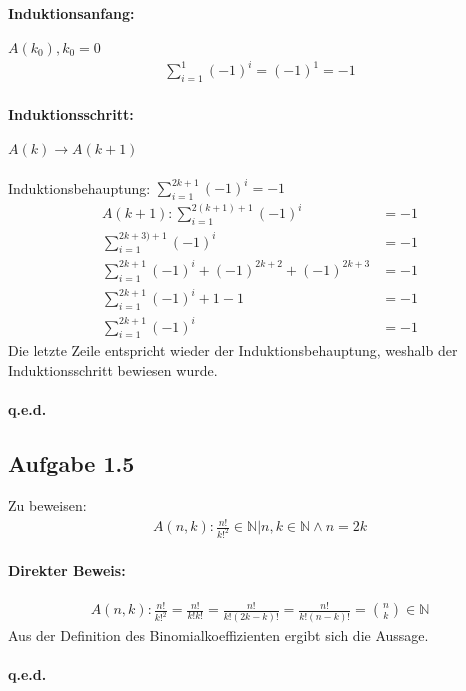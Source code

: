 \documentclass{article}
\begin{document}
    \paragraph*{Induktionsanfang:} $A(k_0), k_0=0$
    \begin{align*}
        \sum^{1}_{i=1}(-1)^i= (-1)^1 = -1
    \end{align*}
    
    \paragraph*{Induktionsschritt:} $A(k) \rightarrow A(k+1)$ \\\\
    Induktionsbehauptung: $\sum^{2k+1}_{i=1}(-1)^i=-1$
    \begin{align*}
        A(k+1): \sum^{2(k+1)+1}_{i=1}(-1)^i &= -1\\
        \sum^{2k+3)+1}_{i=1}(-1)^i &= -1 \\
        \sum^{2k+1}_{i=1}(-1)^i + (-1)^{2k+2} + (-1)^{2k+3} &= -1 \\
        \sum^{2k+1}_{i=1}(-1)^i + 1 - 1 &= -1\\
        \sum^{2k+1}_{i=1}(-1)^i &= -1
    \end{align*}
    Die letzte Zeile entspricht wieder der Induktionsbehauptung, weshalb der Induktionsschritt bewiesen wurde. \\\\
    \textbf{q.e.d.}


    \subsection*{Aufgabe 1.5}
    Zu beweisen:
    \begin{align*}
        A(n, k): \frac{n!}{k!^2} \in \mathbb{N} | n, k \in \mathbb{N} \land n = 2k
    \end{align*}
    \paragraph*{Direkter Beweis:}
    \begin{align*}
        A(n, k): \frac{n!}{k!^2} = \frac{n!}{k!k!} = \frac{n!}{k!(2k-k)!} = \frac{n!}{k!(n-k)!} = \binom{n}{k} \in \mathbb{N}
    \end{align*}
    Aus der Definition des Binomialkoeffizienten ergibt sich die Aussage. \\\\
    \textbf{q.e.d.}
\end{document}
